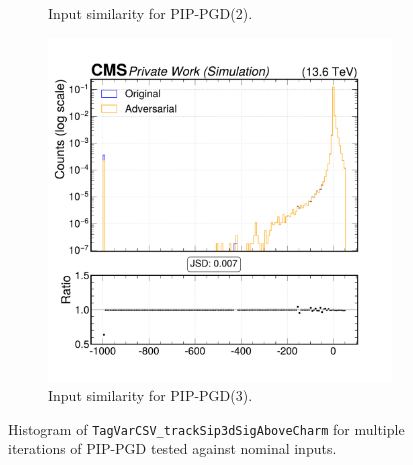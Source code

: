 \begin{figure}[h]
\begin{subfigure}[t]{0.32\textwidth}
    \caption*{Input similarity for PIP-PGD(2).}
  \end{subfigure}\hfill
  \begin{subfigure}[t]{0.32\textwidth}
    \includegraphics[width=\linewidth]{media/output/features/compare/combined_it_3/cmp_global_features_TagVarCSV_trackSip3dSigAboveCharm.pdf}
    \caption*{Input similarity for PIP-PGD(3).}
  \end{subfigure}

  \caption*{Histogram of \texttt{TagVarCSV\_trackSip3dSigAboveCharm} for multiple iterations of PIP-PGD tested against nominal inputs.}
  \label{fig:combined_input_TagVarCSV_trackSip3dSigAboveCharm}
\end{figure}

